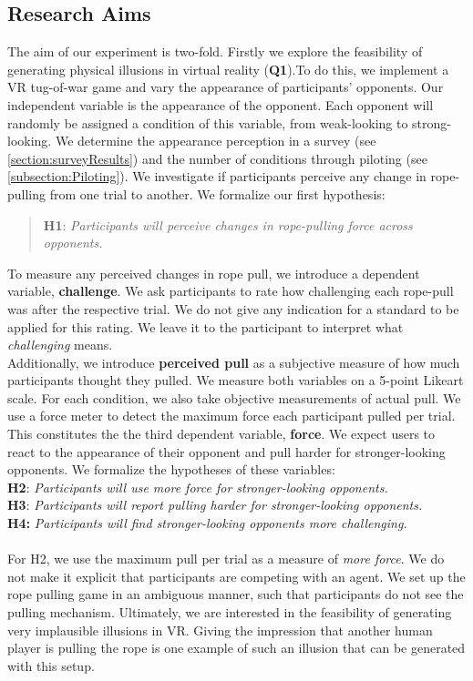 \subsection{Research Aims}
The aim of our experiment is two-fold. Firstly we explore the feasibility of generating physical illusions in virtual reality (\textbf{Q1}).To do this, we implement a VR tug-of-war game and vary the appearance of participants' opponents. Our independent variable is the appearance of the opponent. Each opponent will randomly be assigned a condition of this variable, from weak-looking to strong-looking. We determine the appearance perception in a survey (see \ref{section:surveyResults}) and the number of conditions through piloting (see \ref{subsection:Piloting}).  We investigate if participants perceive any change in rope-pulling from one trial to another. We formalize our first hypothesis:
\begin{quote}
\textbf{H1}: \textit{Participants will perceive changes in rope-pulling force across opponents.}
\end{quote}
To measure any perceived changes in rope pull, we introduce a dependent variable, \textbf{challenge}. We ask participants to rate how challenging each rope-pull was after the respective trial. We do not give any indication for a standard to be applied for this rating. We leave it to the participant to interpret what \textit{challenging} means.\\ Additionally, we introduce \textbf{perceived pull} as a subjective measure of how much participants thought they pulled. We measure both variables on a 5-point Likeart scale. For each condition, we also take objective measurements of actual pull. We use a force meter to detect the maximum force each participant pulled per trial. This constitutes the the third dependent variable, \textbf{force}. We expect users to react to the appearance of their opponent and pull harder for stronger-looking opponents. We formalize the hypotheses of these variables:\\

\textbf{H2}: \textit{Participants will use more force for stronger-looking opponents.}\\

\textbf{H3}: \textit{Participants will report pulling harder for stronger-looking opponents.}\\

\textbf{H4:}\textit{ Participants will find stronger-looking opponents more challenging.}\\
\\
For H2, we use the maximum pull per trial as a measure of \textit{more force}. 
We do not make it explicit that participants are competing with an agent. We set up the rope pulling game in an ambiguous manner, such that participants do not see the pulling mechanism. Ultimately, we are interested in the feasibility of generating very implausible illusions in VR. Giving the impression that another human player is pulling the rope is one example of such an illusion that can be generated with this setup. 


